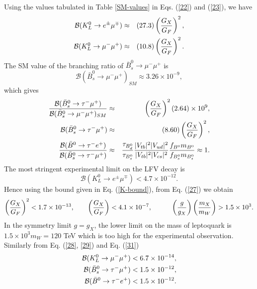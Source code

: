 \documentclass{ws-ijmpa}
\begin{document}
Using the values tabulated in Table \ref{SM-values} in 
 Eqs. (\ref{22}) and (\ref{23}), we have
\begin{eqnarray}
\mathcal{B}(K^{0}_{L}\rightarrow e^{\pm}\mu^{\mp}) &\approx& (27.3) \left({G_X\over G_F}\right)^2  \label{27},\\
\mathcal{B}(K^{0}_{L}\rightarrow \mu^{-}\mu^{+})&\approx&  (10.8) \left({G_X\over G_F}\right)^2 \label{28}.
\end{eqnarray}
The SM value of the branching ratio of $\bar{B}^{0}_{s}\rightarrow \mu^{-}\mu^{+}$ is
\begin{equation}
\mathcal{B}(\bar{B}^{0}_{s}\rightarrow \mu^{-}\mu^{+})_{SM} \approx 3.26 \times 10^{-9}\label{29}, 
\end{equation}
which gives
\begin{eqnarray}
\frac{\mathcal{B}(\bar{B}^{0}_{s}\rightarrow \tau^{-}\mu^{+})}{\mathcal{B}(\bar{B}^{0}_{s}\rightarrow \mu^{-}\mu^{+})_{SM} } &\approx & \left({G_X\over G_F}\right)^2 (2.64) \times 10^{9} \label{30},\\
\mathcal{B}(\bar{B}^{0}_{s}\rightarrow \tau^{-}\mu^{+})  &\approx & (8.60)\left({G_X\over G_F}\right)^2 \label{31} ,\\
\frac{\mathcal{B}(\bar{B}^{0}\rightarrow \tau^{-}e^{+})}{\mathcal{B}(\bar{B}^{0}_{s}\rightarrow \tau^{-}\mu^{+})} &\approx & \frac{\tau_{B^0_d}}{\tau_{B^0_s}}\frac{|V_{tb}|^2|V_{ud}|^2}{|V_{tb}|^2|V_{cs}|^2} \frac{f_{B^0}m_{B^0}}{f_{B^0_s}m_{B^0_s}} \approx 1\label{31-a}.
\end{eqnarray}
The most stringent experimental limit on the LFV decay is
\begin{equation}
\mathcal{B}(K^{0}_{L}\rightarrow e^{\pm}\mu^{\mp}) <4.7\times 10^{-12}\label{K-bound}.
\end{equation}
Hence using the bound given in Eq. (\ref{K-bound}), from Eq. (\ref{27}) we obtain
\begin{equation}
 \left({G_X\over G_F}\right)^2 <1.7\times 10^{-13},\quad\quad \left({G_X\over G_F}\right) <4.1\times 10^{-7}, \quad\quad\quad  \left({g\over g_X}\right) \left({m_X\over m_W}\right)>1.5 \times 10^{3}.
\end{equation}
In the symmetry limit $g = g_{X}$, the lower limit on the mass of leptoquark is $1.5 \times 10^{3} m_{W} = 120$ TeV which is too high for the experimental observation. 
Similarly from Eq. (\ref{28}, \ref{29}) and Eq. (\ref{31})
\begin{eqnarray}
\mathcal{B}(K^{0}_{L}\rightarrow \mu^{-}\mu^{+}) < 6.7\times 10^{-14}\notag ,\\
\mathcal{B}(\bar{B}^{0}_{s}\rightarrow \tau^{-}\mu^{+}) <  1.5\times 10^{-12}\notag ,\\
\mathcal{B}(\bar{B}^{0}\rightarrow \tau^{-}e^{+})  <  1.5\times 10^{-12} \label{32}.
\end{eqnarray}
\end{document}
